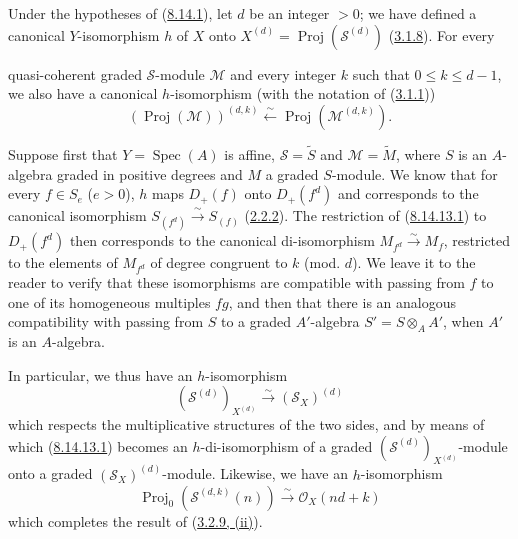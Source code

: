 \begin{remark}[8.14.13]
\label{II.8.14.13}
Under the hypotheses of (\hyperref[II.8.14.1]{8.14.1}), let $d$ be an
integer $>0$; we have defined a canonical $Y$-isomorphism $h$ of $X$ onto
$X^{(d)}=\operatorname{Proj}(\mathcal{S}^{(d)})$
(\hyperref[II.3.1.8]{3.1.8}). For every

quasi-coherent graded $\mathcal{S}$-module $\mathcal{M}$ and every integer $k$
such that $0\leqslant k\leqslant d-1$, we also have a canonical
$h$-isomorphism (with the notation of (\hyperref[II.3.1.1]{3.1.1}))
\begin{equation}
\label{II.8.14.13.1}
  (\operatorname{Proj}(\mathcal{M}))^{(d,k)}
  \xleftarrow{\sim}\operatorname{Proj}(\mathcal{M}^{(d,k)}).
\tag{8.14.13.1}
\end{equation}

Suppose first that $Y=\operatorname{Spec}(A)$ is affine,
$\mathcal{S}=\widetilde{S}$ and $\mathcal{M}=\widetilde{M}$, where $S$ is an
$A$-algebra graded in positive degrees and $M$ a graded $S$-module. We know
that for every $f\in S_e$ ($e>0$), $h$ maps $D_+(f)$ onto $D_+(f^d)$ and
corresponds to the canonical isomorphism
$S_{(f^d)}\xrightarrow{\sim}S_{(f)}$
(\hyperref[II.2.2.2]{2.2.2}). The restriction of
(\hyperref[II.8.14.13.1]{8.14.13.1}) to $D_+(f^d)$ then corresponds to the
canonical di-isomorphism $M_{f^d}\xrightarrow{\sim}M_f$, restricted to the
elements of $M_{f^d}$ of degree congruent to $k$ (mod. $d$). We leave it to
the reader to verify that these isomorphisms are compatible with passing
from $f$ to one of its homogeneous multiples $fg$, and then that there is an
analogous compatibility with passing from $S$ to a graded $A'$-algebra
$S'=S\otimes_A A'$, when $A'$ is an $A$-algebra.

In particular, we thus have an $h$-isomorphism
\begin{equation}
\label{II.8.14.13.2}
  (\mathcal{S}^{(d)})_{X^{(d)}}
  \xrightarrow{\sim}(\mathcal{S}_X)^{(d)}
\tag{8.14.13.2}
\end{equation}
which respects the multiplicative structures of the two sides, and by means
of which (\hyperref[II.8.14.13.1]{8.14.13.1}) becomes an
$h$-di-isomorphism of a graded $(\mathcal{S}^{(d)})_{X^{(d)}}$-module onto a
graded $(\mathcal{S}_X)^{(d)}$-module. Likewise, we have an $h$-isomorphism
\begin{equation}
\label{II.8.14.13.3}
  \operatorname{Proj}_0(\mathcal{S}^{(d,k)}(n))
  \xrightarrow{\sim}\mathcal{O}_X(nd+k)
\tag{8.14.13.3}
\end{equation}
which completes the result of (\hyperref[II.3.2.9]{3.2.9, (ii)}).


\end{remark}
